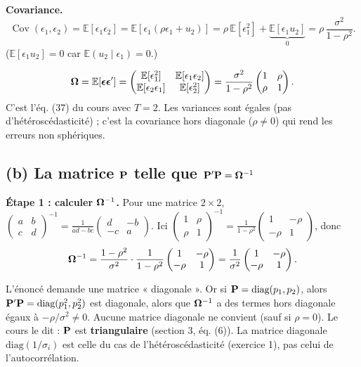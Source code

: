 \documentclass[11pt,a4paper]{article}
\newcommand{\veps}{\bm{\epsilon}}\newcommand{\vu}{\mathbf{u}}\newcommand{\vbeta}{\bm{\beta}}
\newcommand{\E}{\mathbb{E}}\newcommand{\Var}{\operatorname{Var}}\newcommand{\Cov}{\operatorname{Cov}}
\begin{document}
\textbf{Covariance.}
\[
\Cov(\epsilon_1,\epsilon_2)=\E[\epsilon_1\epsilon_2]=\E[\epsilon_1(\rho\epsilon_1+u_2)]=\rho\,\E[\epsilon_1^2]+\underbrace{\E[\epsilon_1u_2]}_{0}=\rho\,\frac{\sigma^2}{1-\rho^2}.
\]
($\E[\epsilon_1u_2]=0$ car $\E(u_2\mid\epsilon_1)=0$.)

\begin{reponse}
\[
\Om=\E[\veps\veps']=\begin{pmatrix}\E[\epsilon_1^2]&\E[\epsilon_1\epsilon_2]\\\E[\epsilon_2\epsilon_1]&\E[\epsilon_2^2]\end{pmatrix}
=\frac{\sigma^2}{1-\rho^2}\begin{pmatrix}1&\rho\\\rho&1\end{pmatrix}.
\]
C'est l'éq. (37) du cours avec $T=2$. Les variances sont égales (pas d'hétéroscédasticité) ; c'est la covariance hors diagonale ($\rho\neq0$) qui rend les erreurs non sphériques.
\end{reponse}

\subsection*{(b) La matrice $\Pm$ telle que $\mathbf{P}'\mathbf{P}=\bm{\Omega}^{-1}$}

\textbf{Étape 1 : calculer $\bm{\Omega}^{-1}$.} Pour une matrice $2\times2$, $\begin{pmatrix}a&b\\c&d\end{pmatrix}^{-1}=\frac1{ad-bc}\begin{pmatrix}d&-b\\-c&a\end{pmatrix}$. Ici $\begin{pmatrix}1&\rho\\\rho&1\end{pmatrix}^{-1}=\frac1{1-\rho^2}\begin{pmatrix}1&-\rho\\-\rho&1\end{pmatrix}$, donc
\[
\bm{\Omega}^{-1}=\frac{1-\rho^2}{\sigma^2}\cdot\frac{1}{1-\rho^2}\begin{pmatrix}1&-\rho\\-\rho&1\end{pmatrix}=\frac1{\sigma^2}\begin{pmatrix}1&-\rho\\-\rho&1\end{pmatrix}.
\]

\begin{attention}[title={$\Pm$ ne peut pas être diagonale}]
L'énoncé demande une matrice « diagonale ». Or si $\mathbf{P}=\text{diag}(p_1,p_2)$, alors $\mathbf{P}'\mathbf{P}=\text{diag}(p_1^2,p_2^2)$ est diagonale, alors que $\bm{\Omega}^{-1}$ a des termes hors diagonale égaux à $-\rho/\sigma^2\neq0$. Aucune matrice diagonale ne convient (sauf si $\rho=0$). Le cours le dit : $\Pm$ est \textbf{triangulaire} (section 3, éq. (6)). La matrice diagonale $\text{diag}(1/\sigma_i)$ est celle du cas de l'hétéroscédasticité (exercice 1), pas celui de l'autocorrélation.
\end{attention}
\end{document}
